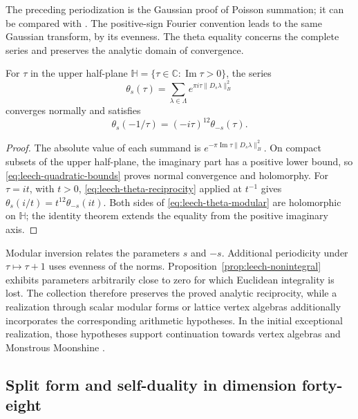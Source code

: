 The preceding periodization is the Gaussian proof of Poisson summation;
it can be compared with \cite[Theorem 2, pp.~10--11]{Elkies}.
The positive-sign Fourier convention leads to the same
Gaussian transform, by its evenness. The theta equality
concerns the complete series and preserves the analytic domain of
convergence.

\begin{proposition}
\label{prop:leech-theta-complex}
For \(\tau\) in the upper half-plane
\(\mathbb H=\{\tau\in\mathbb C:\operatorname{Im}\tau>0\}\), the series
\begin{equation}
 \theta_s(\tau)=\sum_{\lambda\in\Lambda}
             e^{\pi i\tau\|D_s\lambda\|_B^2}
 \label{eq:leech-theta-complex}
\end{equation}
converges normally and satisfies
\begin{equation}
 \theta_s(-1/\tau)=(-i\tau)^{12}\theta_{-s}(\tau).
 \label{eq:leech-theta-modular}
\end{equation}
\end{proposition}
\begin{proof}
The absolute value of each summand is
\(e^{-\pi\operatorname{Im}\tau\|D_s\lambda\|_B^2}\).
On compact subsets of the upper half-plane, the imaginary part has
a positive lower bound, so
\eqref{eq:leech-quadratic-bounds} proves normal convergence and
holomorphy. For \(\tau=it\), with \(t>0\),
\eqref{eq:leech-theta-reciprocity} applied at \(t^{-1}\) gives
\(\theta_s(i/t)=t^{12}\theta_{-s}(it)\).
Both sides of \eqref{eq:leech-theta-modular} are holomorphic
on \(\mathbb H\); the identity theorem extends the equality
from the positive imaginary axis.
\end{proof}

Modular inversion relates the parameters \(s\) and \(-s\).
Additional periodicity under \(\tau\mapsto\tau+1\) uses
evenness of the norms. Proposition~\ref{prop:leech-nonintegral}
exhibits parameters arbitrarily close to zero for which
Euclidean integrality is lost. The collection therefore preserves
the proved analytic reciprocity, while a realization
through scalar modular forms or lattice vertex
algebras additionally incorporates the corresponding arithmetic
hypotheses. In the initial exceptional realization, those
hypotheses support continuation towards vertex algebras
and Monstrous Moonshine \cite{HMT-IV}.

\subsection{Split form and self-duality in dimension forty-eight}
\label{subsec:leech-split}

